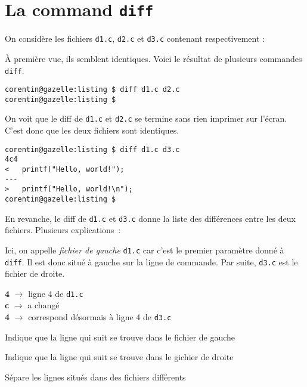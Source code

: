 \documentclass[10pt]{article}
\begin{document}
\newpage

\section{La command \texttt{diff}}

On considère les fichiers \texttt{d1.c}, \texttt{d2.c} et \texttt{d3.c}
 contenant respectivement :

  
  
  

\vspace{0.5cm}

À première vue, ils semblent identiques. Voici le résultat de
plusieurs commandes \texttt{diff}.

\begin{Verbatim}[xleftmargin=2em]
corentin@gazelle:listing $ diff d1.c d2.c
corentin@gazelle:listing $
\end{Verbatim}

On voit que le diff de \texttt{d1.c} et \texttt{d2.c} se termine
sans rien imprimer sur l'écran. C'est donc que les deux fichiers sont
identiques.

\begin{Verbatim}[xleftmargin=2em]
corentin@gazelle:listing $ diff d1.c d3.c
4c4
< 	printf("Hello, world!");
---
> 	printf("Hello, world!\n");
corentin@gazelle:listing $
\end{Verbatim}

En revanche, le diff de \texttt{d1.c} et \texttt{d3.c} donne la
liste des différences entre les deux fichiers. Plusieurs
explications~:

\begin{description}[leftmargin=!,labelwidth=\widthof{\bfseries gauche/droite}]
\item[gauche/droite] Ici, on appelle \textit{fichier de gauche}
\texttt{d1.c} car c'est le premier paramètre donné à \texttt{diff}. Il
est donc situé à gauche sur la ligne de commande. Par suite,
\texttt{d3.c} est le fichier de droite.
\item[4c4] \textbf{4} $\rightarrow$ ligne 4 de \texttt{d1.c} \\
  \textbf{c} $\rightarrow$ a changé \\
  \textbf{4} $\rightarrow$ correspond désormais à ligne 4 de \texttt{d3.c}
\item[\texttt{<}] Indique que la ligne qui suit se trouve dans le fichier de
  gauche
\item[\texttt{>}] Indique que la ligne qui suit se trouve dans le gichier de
  droite
\item[\texttt{------}] Sépare les lignes situés dans des fichiers différents
\end{description}
\end{document}
